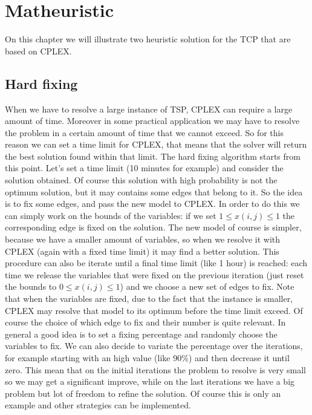 \chapter{Matheuristic}
On this chapter we will illustrate two heuristic solution for the TCP that are based on CPLEX.

\section{Hard fixing}
When we have to resolve a large instance of TSP, CPLEX can require a large amount of time. Moreover in some practical application we may have to resolve the problem in a certain amount of time that we cannot exceed. So for this reason we can set a time limit for CPLEX, that means that the solver will return the best solution found within that limit. The hard fixing algorithm starts from this point. Let's set a time limit (10 minutes for example) and consider the solution obtained. Of course this solution with high probability is not the optimum solution, but it may contains some edges that belong to it. So the idea is to fix some edges, and pass the new model to CPLEX. In order to do this we can simply work on the bounds of the variables: if we set $1 \leq x(i,j) \leq 1$ the corresponding edge is fixed on the solution. The new model of course is simpler, because we have a smaller amount of variables, so when we resolve it with CPLEX (again with a fixed time limit) it may find a better solution. This procedure can also be iterate until a final time limit (like 1 hour) is reached: each time we release the variables that were fixed on the previous iteration (just reset the bounds to $0 \leq x(i,j) \leq 1$) and we choose a new set of edges to fix.
Note that when the variables are fixed, due to the fact that the instance is smaller, CPLEX may resolve that model to its optimum before the time limit exceed.
Of course the choice of which edge to fix and their number is quite relevant. In general a good idea is to set a fixing percentage and randomly choose the variables to fix. We can also decide to variate the percentage over the iterations, for example starting with an high value (like 90\%) and then decrease it until zero. This mean that on the initial iterations the problem to resolve is very small so we may get a significant improve, while on the last iterations we have a big problem but lot of freedom to refine the solution. Of course this is only an example and other strategies can be implemented. 


